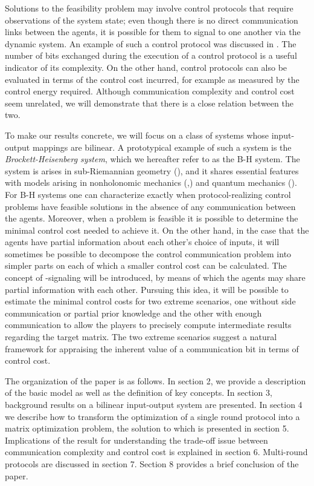 \documentclass[12pt,onecolumn,draftcls]{IEEEtran}
\begin{document}
Solutions to the feasibility problem may involve control protocols that require observations of the
system state; even though there is no direct communication links between the agents, it is possible for
them to signal to one another via the dynamic system.   An example of such a control protocol was
discussed in \cite{WB}.   The number of bits exchanged during the execution of a control protocol
is a useful indicator of its complexity.   On the other hand, control protocols can also be evaluated in terms of the control cost incurred, for example as measured by the control energy required.   Although communication complexity and control cost seem unrelated, we will demonstrate that there is a close relation between the two.

To make our results concrete, we will focus on a class of systems whose input-output mappings are bilinear.   A prototypical example of such a system is the {\em Brockett-Heisenberg system}, which we hereafter refer to as the B-H system. 
The system is arises in  sub-Riemannian geometry  (\cite{rwb1}), and it shares essential features with models arising in nonholonomic mechanics (\cite{RB1},\cite{RB2}) and quantum mechanics (\cite{WB}).  For B-H systems one can characterize exactly when protocol-realizing control problems have feasible solutions in the absence of any communication between the agents.  Moreover, when a problem is feasible it is possible to determine the minimal control cost needed to achieve it.
On the other hand, in the case that the agents have partial information about each other's choice of inputs, it will sometimes be possible to decompose the control communication problem into simpler parts on each of which a smaller control cost can be calculated.  The concept of -signaling will be introduced, by means of which the agents may share partial information with each other.  Pursuing this idea, it will be possible to estimate the minimal control costs for  two extreme scenarios, one without side communication or partial prior knowledge and the other with enough communication to allow the players to precisely compute intermediate results regarding the target matrix.  The two extreme scenarios suggest a natural framework for appraising the inherent value of a communication bit in terms of control cost.

The organization of the paper is as follows.  In section 2, we provide a description of the basic
model  as well as the definition of key concepts. 
In section 3, background results on a bilinear input-output system are presented.
In section 4 we describe how to transform the optimization of a single round protocol into a matrix optimization
problem, the solution to which is presented in section 5.  Implications of the result
for understanding  the trade-off issue between communication complexity and control cost is explained in
section 6.   Multi-round protocols are discussed in section 7. 
Section 8 provides a brief conclusion of the paper. 
\end{document}
